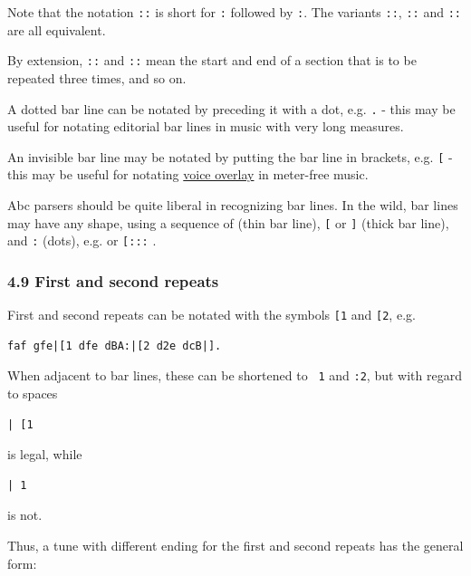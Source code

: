 \documentclass[oneside]{book}
\begin{document}
Note that the notation \texttt{::} is short for \texttt{:\textbar{}}
followed by \texttt{\textbar{}:}. The variants \texttt{::},
\texttt{:\textbar{}:} and \texttt{:\textbar{}\textbar{}:} are all
equivalent.

By extension, \texttt{\textbar{}::} and \texttt{::\textbar{}} mean the
start and end of a section that is to be repeated three times, and so
on.

A dotted bar line can be notated by preceding it with a dot, e.g.
\texttt{.\textbar{}} - this may be useful for notating editorial bar
lines in music with very long measures.

An invisible bar line may be notated by putting the bar line in
brackets, e.g. \texttt{{[}\textbar{}{]}} - this may be useful for
notating \protect\hyperlink{voice_overlay}{voice overlay} in meter-free
music.

Abc parsers should be quite liberal in recognizing bar lines. In the
wild, bar lines may have any shape, using a sequence of
\texttt{\textbar{}} (thin bar line), \texttt{{[}} or \texttt{{]}} (thick
bar line), and \texttt{:} (dots), e.g. \texttt{\textbar{}{[}\textbar{}}
or \texttt{{[}\textbar{}:::} .

\hypertarget{first_and_second_repeats}{\subsubsection{4.9 First and
second repeats}\label{first_and_second_repeats}}

First and second repeats can be notated with the symbols \texttt{{[}1}
and \texttt{{[}2}, e.g.

\begin{verbatim}
faf gfe|[1 dfe dBA:|[2 d2e dcB|].
\end{verbatim}

When adjacent to bar lines, these can be shortened to
\texttt{\ \textbar{}1} and \texttt{:\textbar{}2}, but with regard to
spaces

\begin{verbatim}
| [1
\end{verbatim}

is legal, while

\begin{verbatim}
| 1
\end{verbatim}

is not.

Thus, a tune with different ending for the first and second repeats has
the general form:
\end{document}
